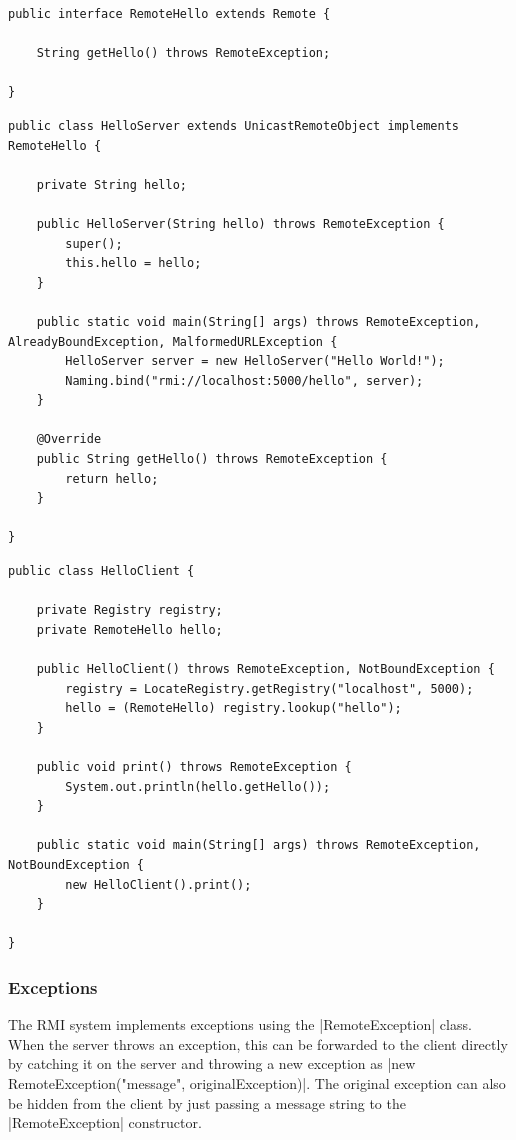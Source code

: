 \documentclass[a4paper]{article}
\begin{document}
\begin{lstlisting}
public interface RemoteHello extends Remote {

    String getHello() throws RemoteException;

}
\end{lstlisting}

\begin{lstlisting}
public class HelloServer extends UnicastRemoteObject implements RemoteHello {

    private String hello;

    public HelloServer(String hello) throws RemoteException {
        super();
        this.hello = hello;
    }

    public static void main(String[] args) throws RemoteException, AlreadyBoundException, MalformedURLException {
        HelloServer server = new HelloServer("Hello World!");
        Naming.bind("rmi://localhost:5000/hello", server);
    }

    @Override
    public String getHello() throws RemoteException {
        return hello;
    }

}
\end{lstlisting}

\begin{lstlisting}
public class HelloClient {

    private Registry registry;
    private RemoteHello hello;

    public HelloClient() throws RemoteException, NotBoundException {
        registry = LocateRegistry.getRegistry("localhost", 5000);
        hello = (RemoteHello) registry.lookup("hello");
    }

    public void print() throws RemoteException {
        System.out.println(hello.getHello());
    }

    public static void main(String[] args) throws RemoteException, NotBoundException {
        new HelloClient().print();
    }

}
\end{lstlisting}

\subsubsection{Exceptions}

The RMI system implements exceptions using the |RemoteException| class. When the server throws an exception, this can be forwarded to the client directly by catching it on the server and throwing a new exception as |new RemoteException("message", originalException)|. The original exception can also be hidden from the client by just passing a message string to the |RemoteException| constructor.
\end{document}
